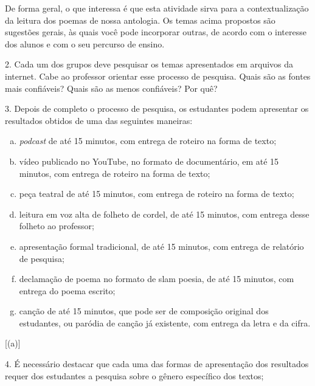 \documentclass[11pt]{extarticle}
\begin{document}
De forma geral, o que interessa é que esta atividade sirva para a
contextualização da leitura dos poemas de nossa antologia. Os temas
acima propostos são sugestões gerais, às quais você pode incorporar
outras, de acordo com o interesse dos alunos e com o seu percurso de
ensino.

\vspace{3mm}

2. Cada um dos grupos deve pesquisar os temas apresentados em arquivos
da internet. Cabe ao professor orientar esse processo de pesquisa. Quais
são as fontes mais confiáveis? Quais são as menos confiáveis? Por quê?

\vspace{3mm}

3. Depois de completo o processo de pesquisa, os estudantes podem
apresentar os resultados obtidos de uma das seguintes maneiras:

\begin{enumerate}[(a)]

\item \textit{podcast} de até 15 minutos, com entrega de roteiro na forma de texto;

\item vídeo publicado no YouTube, no formato de documentário, em até 15
minutos, com entrega de roteiro na forma de texto;

\item peça teatral de até 15 minutos, com entrega de roteiro na forma de
texto;

\item leitura em voz alta de folheto de cordel, de até 15 minutos, com
entrega desse folheto ao professor;

\item apresentação formal tradicional, de até 15 minutos, com entrega de
relatório de pesquisa;

\item declamação de poema no formato de slam poesia, de até 15 minutos, com
entrega do poema escrito;

\item canção de até 15 minutos, que pode ser de composição original dos
estudantes, ou paródia de canção já existente, com entrega da letra e da
cifra.
\end{enumerate}[(a)]

4. É necessário destacar que cada uma das formas de apresentação dos
resultados requer dos estudantes a pesquisa sobre o gênero específico
dos textos;
\end{document}
